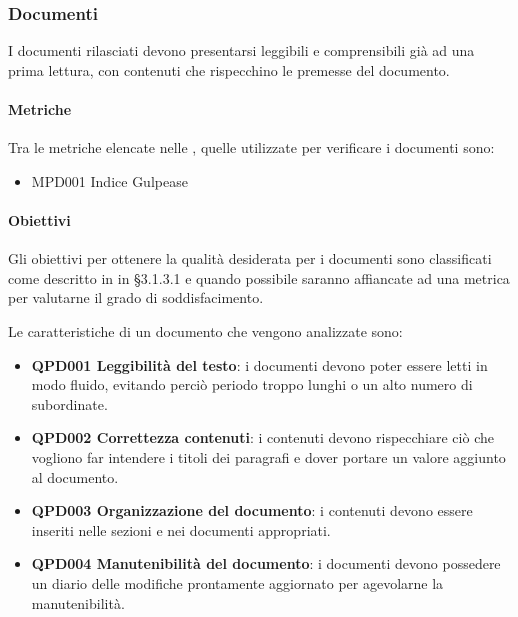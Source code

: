 	\subsubsection{Documenti}
	I documenti rilasciati devono presentarsi leggibili e comprensibili già ad una prima lettura, con contenuti che rispecchino le premesse del documento.

		\paragraph*{Metriche} %
		Tra le metriche elencate nelle \NdPd, quelle utilizzate per verificare i documenti sono:
		
		\begin{itemize}
			\item MPD001 Indice Gulpease
		\end{itemize} 
		
		\paragraph*{Obiettivi} %
		Gli obiettivi per ottenere la qualità desiderata per i documenti sono classificati come descritto in \Doc{\NdPv} in §3.1.3.1 e quando possibile saranno
		affiancate ad una metrica per valutarne il grado di soddisfacimento.
		
		Le caratteristiche di un documento che vengono analizzate sono:
		
		\begin{itemize}
			\item \textbf{QPD001 Leggibilità del testo}: i documenti devono poter essere letti in modo fluido, evitando perciò periodo troppo lunghi o un alto numero di subordinate.
			\item \textbf{QPD002 Correttezza contenuti}: i contenuti devono rispecchiare ciò che vogliono far intendere i titoli dei paragrafi e dover portare un valore aggiunto al documento.
			\item \textbf{QPD003 Organizzazione del documento}: i contenuti devono essere inseriti nelle sezioni e nei documenti appropriati.
			\item \textbf{QPD004 Manutenibilità del documento}: i documenti devono possedere un diario delle modifiche prontamente aggiornato per agevolarne la manutenibilità.
		\end{itemize}

